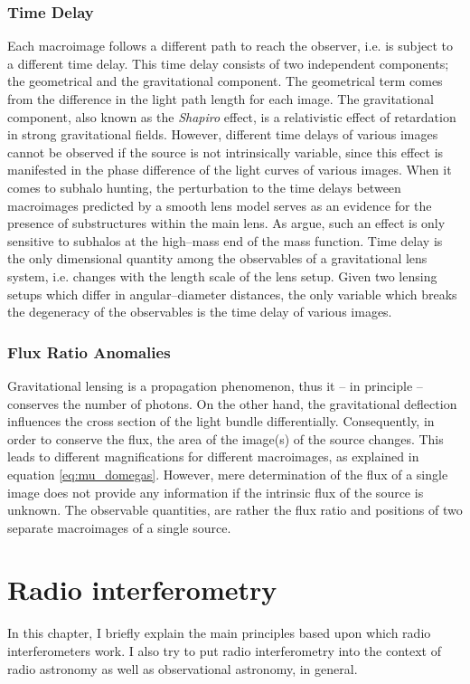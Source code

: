 \documentclass[a4wide,12pt]{book}
\newcommand{\ignore}[1]{}
\begin{document}
\subsection{Time Delay}
Each macroimage follows a different path to reach the observer, i.e. is subject to a different time delay. This time delay consists of two independent components; the geometrical and the gravitational component. The geometrical term comes from the difference in the light path length for each image. The gravitational component, also known as the \emph{Shapiro} effect, is a relativistic effect of retardation in strong gravitational fields. However, different time delays of various images cannot be observed if the source is not intrinsically variable, since this effect is manifested in the phase difference of the light curves of various images. When it comes to subhalo hunting, the perturbation to the time delays between macroimages predicted by a smooth lens model serves as an evidence for the presence of substructures within the main lens\ignore{ (see Figure \hyperref[fig:time_delay]{2.4})}. As \citet{Moustakas+2009} argue, such an effect is only sensitive to subhalos at the high--mass end of the mass function. Time delay is the only dimensional quantity among the observables of a gravitational lens system, i.e. changes with the length scale of the lens setup. Given two lensing setups which differ in angular--diameter distances, the only variable which breaks the degeneracy of the observables is the time delay of various images.
  
\subsection{Flux Ratio Anomalies}
\label{subsec:Flux Ratio Anomalies}
Gravitational lensing is a propagation phenomenon, thus it -- in principle -- conserves the number of photons. On the other hand, the gravitational deflection influences the cross section of the light bundle differentially. Consequently, in order to conserve the flux, the area of the image(s) of the source changes. This leads to different magnifications for different macroimages, as explained in equation \ref{eq:mu_domegas}. However, mere determination of the flux of a single image does not provide any information if the intrinsic flux of the source is unknown. The observable quantities, are rather the flux ratio and positions of two separate macroimages of a single source.

\chapter{Radio interferometry}
In this chapter, I briefly explain the main principles based upon which radio interferometers work. I also try to put radio interferometry into the context of radio astronomy as well as observational astronomy, in general.
\end{document}
